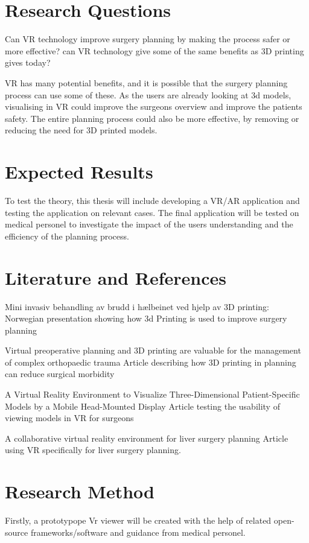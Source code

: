 \documentclass[11pt]{article}
\begin{document}
\section{Research Questions}

Can VR technology improve surgery planning by making the process safer or more effective?
can VR technology give some of the same benefits as 3D printing gives today?

VR has many potential benefits, and it is possible that the surgery planning process can use some of these. As the users are already looking at 3d models, visualising in VR could improve the surgeons overview and improve the patients safety. The entire planning process could also be more effective, by removing or reducing the need for 3D printed models.

\section{Expected Results}
To test the theory, this thesis will include developing a VR/AR application and testing the application on relevant cases.
The final application will be tested on medical personel to investigate the impact of the users understanding and the efficiency of the planning process. 

\section{Literature and References}
Mini invasiv behandling av brudd i hælbeinet ved hjelp av 3D printing:
Norwegian presentation showing how 3d Printing is used to improve surgery planning

Virtual preoperative planning and 3D printing are valuable for the management of complex orthopaedic trauma
Article describing how 3D printing in planning can reduce surgical morbidity

A Virtual Reality Environment to Visualize Three-Dimensional Patient-Specific Models by a Mobile Head-Mounted Display
Article testing the usability of viewing models in VR for surgeons

A collaborative virtual reality environment for liver surgery planning
Article using VR specifically for liver surgery planning.

\section{Research Method}
    Firstly, a prototypope Vr viewer will be created with the help of related open-source frameworks/software and guidance from medical personel.
    
\end{document}
